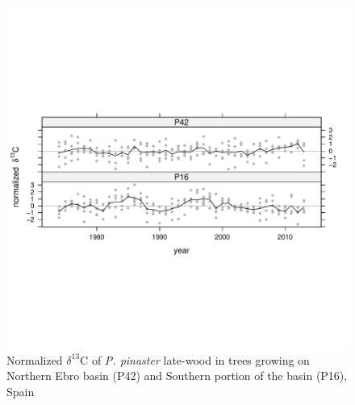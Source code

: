 \documentclass[review,authoryear]{elsarticle}
\begin{document}
\clearpage
\begin{figure}\centering
\includegraphics[scale=0.9,trim=20mm 0mm 20mm 0mm]{isoYr}
\caption{Normalized $\delta^{13}$C of
  \textit{P. pinaster} late-wood in trees growing on Northern Ebro basin
  (P42) and Southern portion of the basin (P16), Spain}
\label{fig:isoyr} 
\end{figure}
\end{document}
